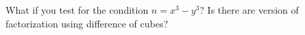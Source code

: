   What if you test for the condition $n = x^3 - y^3$?
  Is there are version of
  factorization using difference of cubes?
